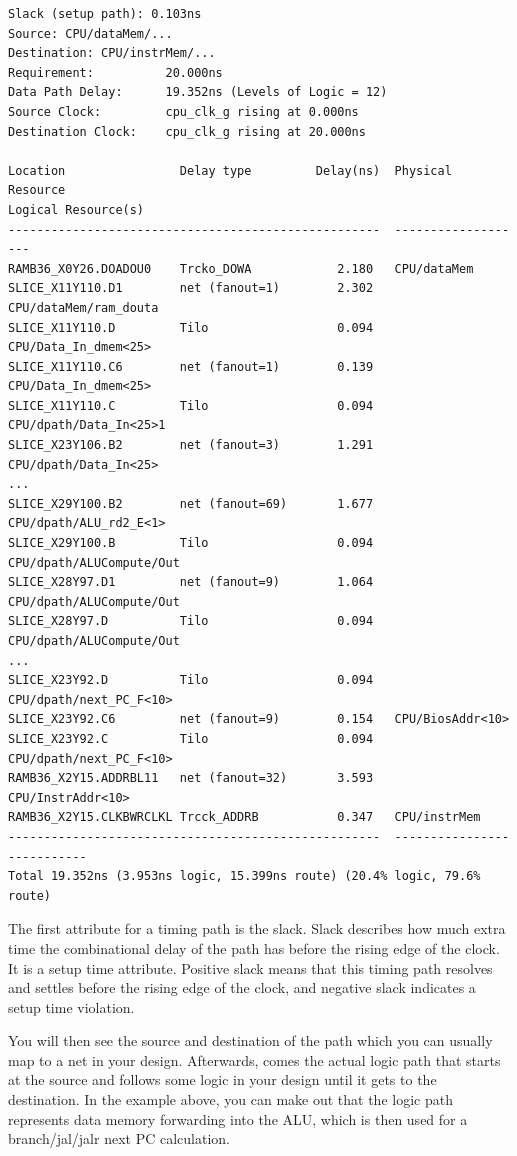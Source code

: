 \documentclass[11pt]{article}
\begin{document}
\begin{verbatim}
Slack (setup path): 0.103ns
Source: CPU/dataMem/...
Destination: CPU/instrMem/...
Requirement:          20.000ns
Data Path Delay:      19.352ns (Levels of Logic = 12)
Source Clock:         cpu_clk_g rising at 0.000ns
Destination Clock:    cpu_clk_g rising at 20.000ns

Location                Delay type         Delay(ns)  Physical Resource
Logical Resource(s)
----------------------------------------------------  -------------------
RAMB36_X0Y26.DOADOU0    Trcko_DOWA            2.180   CPU/dataMem
SLICE_X11Y110.D1        net (fanout=1)        2.302   CPU/dataMem/ram_douta
SLICE_X11Y110.D         Tilo                  0.094   CPU/Data_In_dmem<25>
SLICE_X11Y110.C6        net (fanout=1)        0.139   CPU/Data_In_dmem<25>
SLICE_X11Y110.C         Tilo                  0.094   CPU/dpath/Data_In<25>1
SLICE_X23Y106.B2        net (fanout=3)        1.291   CPU/dpath/Data_In<25>
...
SLICE_X29Y100.B2        net (fanout=69)       1.677   CPU/dpath/ALU_rd2_E<1>
SLICE_X29Y100.B         Tilo                  0.094   CPU/dpath/ALUCompute/Out
SLICE_X28Y97.D1         net (fanout=9)        1.064   CPU/dpath/ALUCompute/Out
SLICE_X28Y97.D          Tilo                  0.094   CPU/dpath/ALUCompute/Out
...
SLICE_X23Y92.D          Tilo                  0.094   CPU/dpath/next_PC_F<10>
SLICE_X23Y92.C6         net (fanout=9)        0.154   CPU/BiosAddr<10>
SLICE_X23Y92.C          Tilo                  0.094   CPU/dpath/next_PC_F<10>
RAMB36_X2Y15.ADDRBL11   net (fanout=32)       3.593   CPU/InstrAddr<10>
RAMB36_X2Y15.CLKBWRCLKL Trcck_ADDRB           0.347   CPU/instrMem
----------------------------------------------------  ---------------------------
Total 19.352ns (3.953ns logic, 15.399ns route) (20.4% logic, 79.6% route)
\end{verbatim}

The first attribute for a timing path is the slack. Slack describes how much extra time the combinational delay of the path has before the rising edge of the clock. It is a setup time attribute. Positive slack means that this timing path resolves and settles before the rising edge of the clock, and negative slack indicates a setup time violation.

You will then see the source and destination of the path which you can usually map to a net in your design. Afterwards, comes the actual logic path that starts at the source and follows some logic in your design until it gets to the destination. In the example above, you can make out that the logic path represents data memory forwarding into the ALU, which is then used for a branch/jal/jalr next PC calculation.
\end{document}
